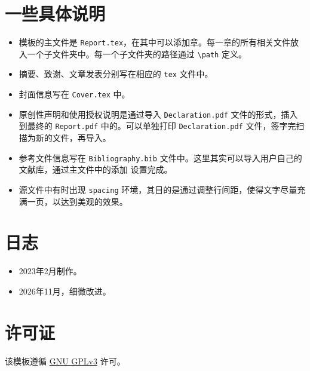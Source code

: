 \section*{一些具体说明}
\begin{itemize}
\item 模板的主文件是 \texttt{Report.tex}，在其中可以添加章。每一章的所有相关文件放入一个子文件夹中。每一个子文件夹的路径通过 \verb"\path" 定义。
\item 摘要、致谢、文章发表分别写在相应的 \texttt{tex} 文件中。 
\item 封面信息写在 \texttt{Cover.tex} 中。
\item 原创性声明和使用授权说明是通过导入 \texttt{Declaration.pdf} 文件的形式，插入到最终的 \texttt{Report.pdf} 中的。可以单独打印 \texttt{Declaration.pdf} 文件，签字完扫描为新的文件，再导入。
\item 参考文件信息写在 \texttt{Bibliography.bib} 文件中。这里其实可以导入用户自己的文献库，通过主文件中的添加 \verb"" 设置完成。
\item 源文件中有时出现 \texttt{spacing} 环境，其目的是通过调整行间距，使得文字尽量充满一页，以达到美观的效果。
\end{itemize}



\section*{日志}
\begin{itemize}
\item 2023年2月制作。
\item 2026年11月，细微改进。
\end{itemize}




\section*{许可证}
该模板遵循 \href{https://choosealicense.com/licenses/gpl-3.0/}{GNU GPLv3} 许可。
